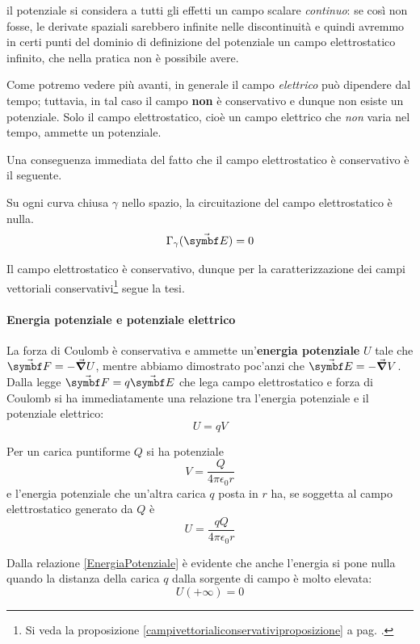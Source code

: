 \begin{observe}\label{PotenzialeContinuo}
	il potenziale si considera a tutti gli effetti un campo scalare \textit{continuo}: se così non fosse, le derivate spaziali sarebbero infinite nelle discontinuità e quindi avremmo in certi punti del dominio di definizione del potenziale un campo elettrostatico infinito, che nella pratica non è possibile avere.
\end{observe}
\begin{attention}
	Come potremo vedere più avanti, in generale il campo \textit{elettrico} può dipendere dal tempo; tuttavia, in tal caso il campo \textbf{non} è conservativo e dunque non esiste un potenziale. Solo il campo elettrostatico, cioè un campo elettrico che \textit{non} varia nel tempo, ammette un potenziale.
\end{attention}
Una conseguenza immediata del fatto che il campo elettrostatico è conservativo è il seguente.
\begin{corollary}
	Su ogni curva chiusa $\gamma$ nello spazio, la circuitazione del campo elettrostatico è nulla.
	\begin{equation}
		\Gamma_{\gamma}(\vba{E})=0
	\end{equation}
\end{corollary}
\begin{demonstration}
	Il campo elettrostatico è conservativo, dunque per la caratterizzazione dei campi vettoriali conservativi\footnote{Si veda la proposizione \ref{campivettorialiconservativiproposizione} a pag. \pageref{campivettorialiconservativiproposizione}.} segue la tesi. 
\end{demonstration}
\paragraph{Energia potenziale e potenziale elettrico}
La forza di Coulomb è conservativa e ammette un'\textbf{energia potenziale} $U$ tale che $\vba{F}=-\grad{U}$, mentre abbiamo dimostrato poc'anzi che $\vba{E}=-\grad{V}$. Dalla legge $\vba{F}=q\vba{E}$ che lega campo elettrostatico e forza di Coulomb si ha immediatamente una relazione tra l'energia potenziale e il potenziale elettrico:
\begin{equation}
	U=qV\label{EnergiaPotenziale}
\end{equation}
\begin{example}
	Per un carica puntiforme $Q$ si ha potenziale
	\begin{equation}
		V=\frac{Q}{4\pi\epsilon_0r}
	\end{equation}
	e l'energia potenziale che un'altra carica $q$ posta in $r$ ha, se soggetta al campo elettrostatico generato da $Q$ è
	\begin{equation}
		U=\frac{qQ}{4\pi\epsilon_0r}
	\end{equation}
\end{example}
Dalla relazione \eqref{EnergiaPotenziale} è evidente che anche l'energia si pone nulla quando la distanza della carica $q$ dalla sorgente di campo è molto elevata:
\begin{equation*}
	U(+\infty)=0
\end{equation*}
